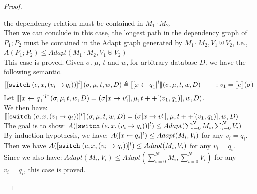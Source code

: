 \documentclass[a4paper,11pt]{article}
\begin{document}
\begin{proof}
\begin{itemize}
the dependency relation must be contained in $M_1 \cdot M_2$.
\\
Then we can conclude in this case, the longest path in the dependency graph of $P_1; P_2$ must be contained in the
Adapt graph generated by $M_1 \cdot M_2, V_1 \uplus V_2 $, i.e., $A(P_1; P_2) \leq Adapt(M_1 \cdot M_2, V_1 \uplus V_2)$.
\\
This case is proved.
%
%
%
%
Given $\sigma$, $\mu$, $t$ and $w$, for arbitrary database $D$, we have the following semantic.
%
%
\[
\llbracket {[\ensuremath{\mathtt{switch}}\;( e, x, (v_i \to  q_i))]^{l}} \rrbracket_{} (\sigma, \mu , t, w , D)  
\triangleq 
\llbracket [\mathrel{ x \leftarrow q }_1]^{l} \rrbracket_{} ( \sigma, \mu , t, w, D ) 
\qquad : v_1 = \llbracket e\rrbracket_{}{(\sigma)}
\]
%
Let $\llbracket[\mathrel{ x \leftarrow q }_1]^{l}\rrbracket_{} (\sigma , \mu, t, w, D) = (\sigma[x \to v_1'] , \mu, t++[(v_1, q_1)], w, D)$.
\\
We then have:
$\llbracket {[\ensuremath{\mathtt{switch}}\;( e, x, (v_i \to  q_i))]^{l}} \rrbracket_{} (\sigma, \mu , t, w , D)  
=(\sigma[x \to v_1'] , \mu, t++[(v_1, q_1)], w, D)
$
\\
The goal is to show:
$A( {[\mathtt{switch}\;( e, x, (v_i \to  q_i))]^{l}}) \leq Adapt(\sum_{i = 0}^{N}M_i, \sum_{i = 0}^{N}V_i)$
\\
By induction hypothesis, we have:
%
$A([\mathrel{ x \leftarrow q }_i]^{l})  \leq Adapt(M_i, V_i)$ for any $v_i = q_i$.
%
\\
Then we have $A( {[\mathtt{switch}\;( e, x, (v_i \to  q_i))]^{l}}) \leq Adapt(M_i, V_i)$ for any $v_i = q_i$.
\\
%
Since we also have: $ Adapt(M_i, V_i) \leq Adapt(\sum_{i = 0}^{N}M_i, \sum_{i = 0}^{N}V_i)$ for any $v_i = q_i$, this case is proved.
%
%

\end{itemize}
\end{proof}
\end{document}
